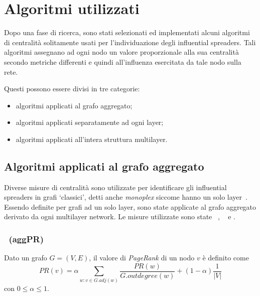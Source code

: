 \chapter{Algoritmi utilizzati}
Dopo una fase di ricerca, sono stati selezionati ed implementati alcuni algoritmi di centralità solitamente usati per 
l'individuazione degli influential spreaders. Tali algoritmi assegnano ad ogni nodo un valore proporzionale alla sua centralità 
secondo metriche differenti e quindi all'influenza esercitata da tale nodo sulla rete.

Questi possono essere divisi in tre categorie:
\begin{itemize}
\item algoritmi applicati al grafo aggregato;
\item algoritmi applicati separatamente ad ogni layer;
\item algoritmi applicati all'intera struttura multilayer.
\end{itemize}

\section{Algoritmi applicati al grafo aggregato}
Diverse misure di centralità sono utilizzate per identificare gli influential spreaders in grafi 
`classici', detti anche \textit{monoplex} siccome hanno un solo layer~\cite{kitsak:infsp}\cite{basaras:infsp}\cite{pei:infsp}. 
Essendo definite per grafi ad un solo layer, sono state applicate al grafo aggregato
derivato da ogni multilayer network. 
Le misure utilizzate sono state \emph{\PageRank}~\cite{page:pagerank}, 
\emph{\kcore}~\cite{batagelj:kcore} e 
\emph{\degree}.


\subsection{\PageRank~(aggPR)}
\label{alg:pagerank}
\begin{definizione}[\PageRank]
    \label{def:pagerank}
    Dato un grafo $G=(V, E)$, il valore di \emph{PageRank} di un nodo $v$ è definito come
    \begin{equation*}
        \mathit{PR}(v) = \alpha\sum_{w : v \in G.\mathit{adj}(w)}
        \frac{\mathit{PR}(w)}{G.\mathit{outdegree}(w)} + 
        (1-\alpha)\frac{1}{|V|}
    \end{equation*}
    con $0 \le \alpha \le 1$.
\end{definizione}


